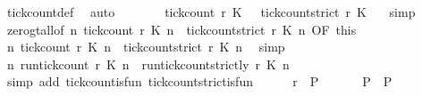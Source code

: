 \begin{isabellebody}
\ tick{\isacharunderscore}count{\isacharunderscore}def\ \isamarkupfalse%
\ auto\isanewline
\ \ \ \ \isamarkupfalse%
\ \isamarkupfalse%
\ {\isacartoucheopen}tick{\isacharunderscore}count\ r\ K\ {}\ {\isasymle}\ tick{\isacharunderscore}count{\isacharunderscore}strict\ r\ K\ {}{\isacartoucheclose}\ \isamarkupfalse%
\ simp\isanewline
\ \ \ \ \isamarkupfalse%
\ zero{\isacharunderscore}gt{\isacharunderscore}all{\isacharbrackleft}of\ {\isacartoucheopen}{\isasymlambda}n{\isachardot}\ tick{\isacharunderscore}count\ r\ K\ n\ {\isasymle}\ tick{\isacharunderscore}count{\isacharunderscore}strict\ r\ K\ n{\isacartoucheclose}{\isacharcomma}\ OF\ this\ {\isacharbrackright}\ {\isacharasterisk}\isanewline
\ \ \ \ \ \ \isamarkupfalse%
\ {\isacartoucheopen}{\isasymforall}n{\isachardot}\ {\isacharparenleft}tick{\isacharunderscore}count\ r\ K\ n{\isacharparenright}\ {\isasymle}\ {\isacharparenleft}tick{\isacharunderscore}count{\isacharunderscore}strict\ r\ K\ n{\isacharparenright}{\isacartoucheclose}\ \isamarkupfalse%
\ simp\isanewline
\ \ \ \ \isamarkupfalse%
\ {\isacartoucheopen}{\isasymforall}n{\isachardot}\ {\isacharparenleft}run{\isacharunderscore}tick{\isacharunderscore}count\ r\ K\ n{\isacharparenright}\ {\isasymle}\ {\isacharparenleft}run{\isacharunderscore}tick{\isacharunderscore}count{\isacharunderscore}strictly\ r\ K\ n{\isacharparenright}{\isacartoucheclose}\isanewline
\ \ \ \ \ \ \isamarkupfalse%
\ {\isacharparenleft}simp\ add{\isacharcolon}\ tick{\isacharunderscore}count{\isacharunderscore}is{\isacharunderscore}fun\ tick{\isacharunderscore}count{\isacharunderscore}strict{\isacharunderscore}is{\isacharunderscore}fun{\isacharparenright}\isanewline
\ \ \ \ \isamarkupfalse%
\ {\isacartoucheopen}r\ {\isasymin}\ {\isacharquery}P{\isacartoucheclose}\ \isacommand{{\isachardot}{\isachardot}}\isamarkupfalse%
\isanewline
\ \ \isacommand{{\isacharbraceright}}\isamarkupfalse%
\ \isamarkupfalse%
\ {\isacartoucheopen}{\isacharquery}P{\isacharprime}\ {\isasymsubseteq}\ {\isacharquery}P{\isacartoucheclose}\ \isacommand{{\isachardot}{\isachardot}}\isamarkupfalse%
\isanewline
{}\isamarkupfalse%
%
\endisatagproof
{\isafoldproof}%
%
\isadelimproof
\isanewline

\end{isabellebody}
